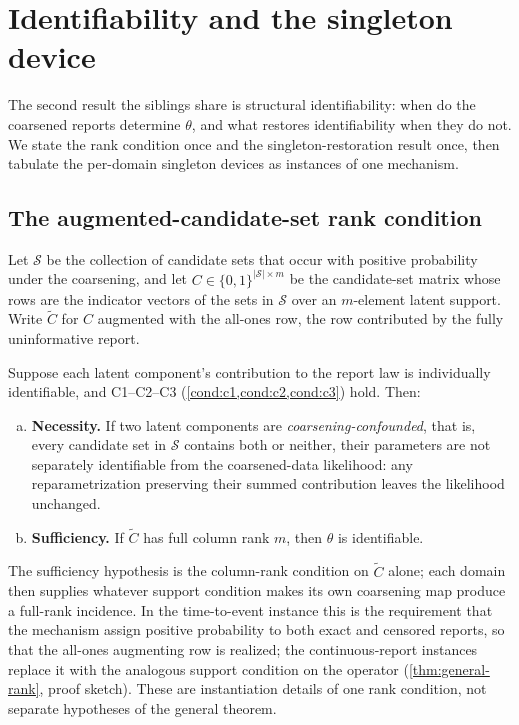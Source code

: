 \section{Identifiability and the singleton device}
\label{sec:identifiability}

The second result the siblings share is structural identifiability:
when do the coarsened reports determine $\theta$, and what restores
identifiability when they do not. We state the rank condition once and
the singleton-restoration result once, then tabulate the per-domain
singleton devices as instances of one mechanism.

\subsection{The augmented-candidate-set rank condition}

Let $\mathcal{S}$ be the collection of candidate sets that occur with
positive probability under the coarsening, and let $C \in
\{0,1\}^{|\mathcal{S}| \times m}$ be the candidate-set matrix whose
rows are the indicator vectors of the sets in $\mathcal{S}$ over an
$m$-element latent support. Write $\tilde C$ for $C$ augmented with the
all-ones row, the row contributed by the fully uninformative report.

\begin{theorem}
\label{thm:general-rank}
Suppose each latent component's contribution to the report law is
individually identifiable, and C1--C2--C3 (\cref{cond:c1,cond:c2,cond:c3})
hold. Then:
\begin{enumerate}[(a)]
\item \textbf{Necessity.} If two latent components are
  \emph{coarsening-confounded}, that is, every candidate set in
  $\mathcal{S}$ contains both or neither, their parameters are not
  separately identifiable from the coarsened-data likelihood: any
  reparametrization preserving their summed contribution leaves the
  likelihood unchanged.
\item \textbf{Sufficiency.} If $\tilde C$ has full column rank $m$, then
  $\theta$ is identifiable.
\end{enumerate}
\end{theorem}

\begin{remark}
\label{rem:rank-instantiation}
The sufficiency hypothesis is the column-rank condition on $\tilde C$
alone; each domain then supplies whatever support condition makes its
own coarsening map produce a full-rank incidence. In the time-to-event
instance this is the requirement that the mechanism assign positive
probability to both exact and censored reports, so that the all-ones
augmenting row is realized; the continuous-report instances replace it
with the analogous support condition on the operator
(\cref{thm:general-rank}, proof sketch). These are instantiation
details of one rank condition, not separate hypotheses of the general
theorem.
\end{remark}

